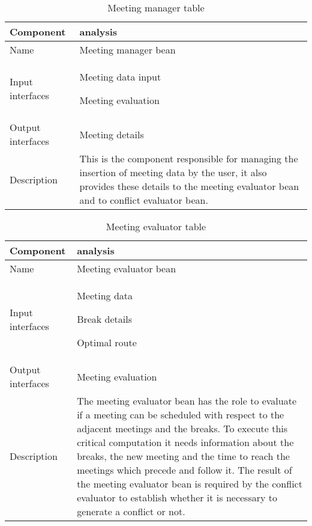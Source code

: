 \begin{flushleft}

\begin{table}[htp]

\begin{tabular}{l|l}
 Component&analysis\\
\hline
\hline
Name&Meeting manager bean\\
\hline
Input interfaces&\item Meeting data input \item Meeting evaluation\\
\hline
Output interfaces& Meeting details\\
\hline
Description&This is the component responsible for managing the insertion of meeting data by the user, it also provides these details to the meeting evaluator bean and to conflict evaluator bean.\\
\hline


\end{tabular}

\caption{Meeting manager  table } 
\label{tab:meetingmanagertable}

\end{table}

\end{flushleft}

\begin{flushleft}
	
	\begin{table}[htp]
		
		\begin{tabular}{l|l}
			Component&analysis\\
			\hline
			\hline
			Name&Meeting evaluator bean\\
			\hline
			Input interfaces&\item Meeting data  \item Break details \item Optimal route\\
			\hline
			Output interfaces& Meeting evaluation\\
			\hline
			Description&The meeting evaluator bean has the role to evaluate if a meeting can be scheduled with respect to the adjacent meetings and the breaks. To execute this critical computation it needs information about the breaks, the new meeting and the time to reach the meetings which precede and follow it. The result of the meeting evaluator bean is required by the conflict evaluator to establish whether it is necessary to generate a conflict or not. \\
			\hline
			
			
		\end{tabular}
		
		\caption{Meeting evaluator  table } 
		\label{tab:meetingevaluatortable}
		
	\end{table}
	
\end{flushleft}

